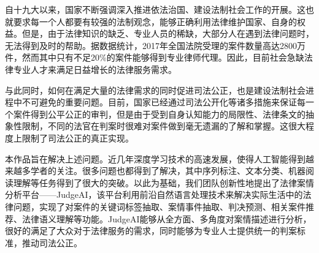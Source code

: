 
\begin{cabstract}
  自十九大以来，国家不断强调深入推进依法治国、建设法制社会工作的开展。这也就要求每一个人都要有较强的法制观念，能够正确利用法律维护国家、自身的权益。但是，由于法律知识的缺乏、专业人员的稀缺，大部分人在遇到法律问题时，无法得到及时的帮助。据数据统计，2017年全国法院受理的案件数量高达2800万件，然而其中只有不足20\%的案件能够得到专业律师代理。因此，目前社会急缺法律专业人才来满足日益增长的法律服务需求。
  
	与此同时，如何在满足大量的法律需求的同时促进司法公正，也是建设法制社会进程中不可避免的重要问题。目前，国家已经通过司法公开化等诸多措施来保证每一个案件得到公平公正的审判，但是由于受到自身认知能力的局限性、法律条文的抽象性限制，不同的法官在判案时很难对案件做到毫无遗漏的了解和掌握。这很大程度上限制了司法公正的真正实现。
	
	本作品旨在解决上述问题。近几年深度学习技术的高速发展，使得人工智能得到越来越多学者的关注。很多问题也都得到了解决，其中序列标注、文本分类、机器阅读理解等任务得到了很大的突破。以此为基础，我们团队创新性地提出了法律案情分析平台——JudgeAI，该平台利用前沿自然语言处理技术来解决实际生活中的法律问题，实现了对案件的关键词标签抽取、案情事件抽取、判决预测、相关案件推荐、法律语义理解等功能。JudgeAI能够从全方面、多角度对案情描述进行分析，很好的满足了大众对于法律服务的需求，同时能够为专业人士提供统一的判案标准，推动司法公正。

\end{cabstract}

